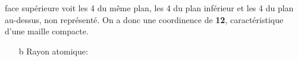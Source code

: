 \documentclass[../../main/main.tex]{subfiles}
\begin{document}
\begin{tcb*}[breakable]
\begin{minipage}[t]{.72\linewidth}
\begin{itemize}
{				face supérieure voit les 4 du même plan, les 4 du plan inférieur et
				les 4 du plan au-dessus, non représenté. On a donc une coordinence de
				\textbf{12}, caractéristique d'une maille compacte.}
		\end{itemize}
	\end{minipage}
	\hfill
	\begin{minipage}[t]{.24\linewidth}
		\vspace{0pt}
		\begin{center}
		\end{center}
	\end{minipage}
	\noindent
	\begin{minipage}[t]{.72\linewidth}
		\begin{itemize}
			\item[b]{Rayon atomique}: 
\end{itemize}
\end{minipage}
\end{tcb*}
\end{document}
